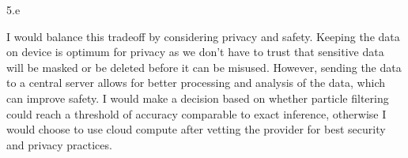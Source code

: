 \LARGE
5.e
\normalsize

\begin{answer}
  I would balance this tradeoff by considering privacy and safety. Keeping the data on device is optimum for privacy as we don't have to trust that sensitive data will be masked or be deleted before it can be misused. However, sending the data to a central server allows for better processing and analysis of the data, which can improve safety. I would make a decision based on whether particle filtering could reach a threshold of accuracy comparable to exact inference, otherwise I would choose to use cloud compute after vetting the provider for best security and privacy practices.
\end{answer}
\clearpage



